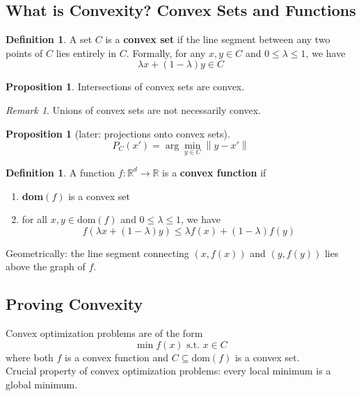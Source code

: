 \documentclass[10pt]{article}
\newcommand{\norm}[1]{\left\lVert#1\right\rVert}					%
\newcommand{\R}{\mathbb{R}}
\theoremstyle{remark}
\newtheorem{remark}[theorem]{Remark}
\theoremstyle{definition}
\newtheorem{definition}[theorem]{Definition}
\newtheorem{prop}[theorem]{Proposition}
\begin{document}
\subsection{What is Convexity? Convex Sets and Functions}
\begin{definition}
	A set $C$ is a \textbf{convex set} if the line segment between any two points of $C$ lies entirely in $C$.
	Formally, for any $x,y \in C$ and $0 \leq \lambda \leq 1$, we have 
	\begin{equation}
		\lambda x + (1-\lambda)y \in C
	\end{equation}
\end{definition}
\begin{prop}
	Intersections of convex sets are convex.
\end{prop}
\begin{remark}
	Unions of convex sets are not necessarily convex.
\end{remark}
\begin{prop}[later: projections onto convex sets]
	\[ P_C(x') = \arg\min_{y \in C} \norm{y - x'} \]
\end{prop}


\begin{definition}
	A function $f: \R^d \to \R$ is a \textbf{convex function} if
	\begin{enumerate}
		\item \textbf{dom}$(f)$ is a convex set
		\item for all $x,y \in \text{dom}(f)$ and $0 \leq \lambda \leq 1$, we have 
		\begin{equation}
			f(\lambda x + (1-\lambda)y) \leq \lambda f(x) + (1-\lambda)f(y)
		\end{equation}
	\end{enumerate}
	Geometrically: the line segment connecting $(x,f(x))$ and $(y,f(y))$ lies above the graph of $f$.
\end{definition}

\subsection{Proving Convexity}
Convex optimization problems are of the form 
\begin{equation}
	\min f(x) \text{  s.t.  } x \in C
\end{equation}
where both $f$ is a convex function and $C\subseteq \text{dom}(f)$ is a convex set.\\

Crucial property of convex optimization problems: every local minimum is a global minimum. 
\end{document}
